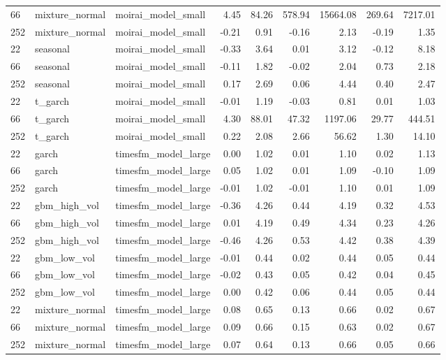{\begin{tabular}{lllrrrrrr}
66 & mixture\_normal & moirai\_model\_small & 4.45 & 84.26 & 578.94 & 15664.08 & 269.64 & 7217.01 \\
252 & mixture\_normal & moirai\_model\_small & -0.21 & 0.91 & -0.16 & 2.13 & -0.19 & 1.35 \\
\midrule
22 & seasonal & moirai\_model\_small & -0.33 & 3.64 & 0.01 & 3.12 & -0.12 & 8.18 \\
66 & seasonal & moirai\_model\_small & -0.11 & 1.82 & -0.02 & 2.04 & 0.73 & 2.18 \\
252 & seasonal & moirai\_model\_small & 0.17 & 2.69 & 0.06 & 4.44 & 0.40 & 2.47 \\
\midrule
22 & t\_garch & moirai\_model\_small & -0.01 & 1.19 & -0.03 & 0.81 & 0.01 & 1.03 \\
66 & t\_garch & moirai\_model\_small & 4.30 & 88.01 & 47.32 & 1197.06 & 29.77 & 444.51 \\
252 & t\_garch & moirai\_model\_small & 0.22 & 2.08 & 2.66 & 56.62 & 1.30 & 14.10 \\
\midrule
22 & garch & timesfm\_model\_large & 0.00 & 1.02 & 0.01 & 1.10 & 0.02 & 1.13 \\
66 & garch & timesfm\_model\_large & 0.05 & 1.02 & 0.01 & 1.09 & -0.10 & 1.09 \\
252 & garch & timesfm\_model\_large & -0.01 & 1.02 & -0.01 & 1.10 & 0.01 & 1.09 \\
\midrule
22 & gbm\_high\_vol & timesfm\_model\_large & -0.36 & 4.26 & 0.44 & 4.19 & 0.32 & 4.53 \\
66 & gbm\_high\_vol & timesfm\_model\_large & 0.01 & 4.19 & 0.49 & 4.34 & 0.23 & 4.26 \\
252 & gbm\_high\_vol & timesfm\_model\_large & -0.46 & 4.26 & 0.53 & 4.42 & 0.38 & 4.39 \\
\midrule
22 & gbm\_low\_vol & timesfm\_model\_large & -0.01 & 0.44 & 0.02 & 0.44 & 0.05 & 0.44 \\
66 & gbm\_low\_vol & timesfm\_model\_large & -0.02 & 0.43 & 0.05 & 0.42 & 0.04 & 0.45 \\
252 & gbm\_low\_vol & timesfm\_model\_large & 0.00 & 0.42 & 0.06 & 0.44 & 0.05 & 0.44 \\
\midrule
22 & mixture\_normal & timesfm\_model\_large & 0.08 & 0.65 & 0.13 & 0.66 & 0.02 & 0.67 \\
66 & mixture\_normal & timesfm\_model\_large & 0.09 & 0.66 & 0.15 & 0.63 & 0.02 & 0.67 \\
252 & mixture\_normal & timesfm\_model\_large & 0.07 & 0.64 & 0.13 & 0.66 & 0.05 & 0.66 \\

\end{tabular}}
